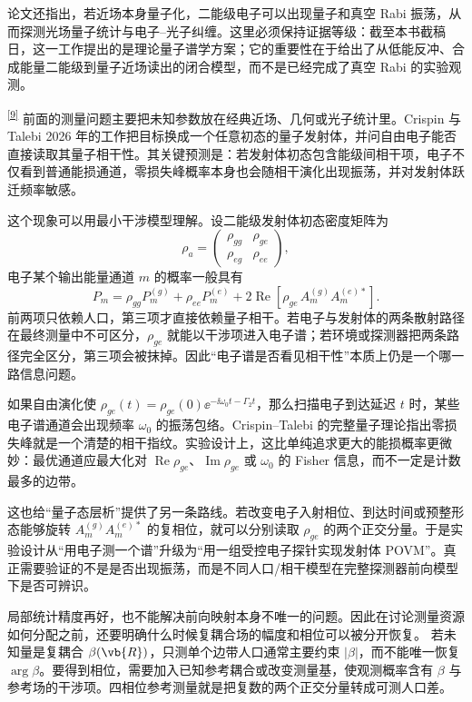 论文还指出，若近场本身量子化，二能级电子可以出现量子和真空 Rabi 振荡，从而探测光场量子统计与电子--光子纠缠。这里必须保持证据等级：截至本书截稿日，这一工作提出的是理论量子谱学方案；它的重要性在于给出了从低能反冲、合成能量二能级到量子近场读出的闭合模型，而不是已经完成了真空 Rabi 的实验观测。


\textsuperscript{\hyperref[ch07-ref9]{[9]}}
前面的测量问题主要把未知参数放在经典近场、几何或光子统计里。Crispin 与 Talebi 2026 年的工作把目标换成一个任意初态的量子发射体，并问自由电子能否直接读取其量子相干性。其关键预测是：若发射体初态包含能级间相干项，电子不仅看到普通能损通道，零损失峰概率本身也会随相干演化出现振荡，并对发射体跃迁频率敏感。

这个现象可以用最小干涉模型理解。设二能级发射体初态密度矩阵为
\begin{equation}
\rho_a=
\begin{pmatrix}
\rho_{gg}&\rho_{ge}\\
\rho_{eg}&\rho_{ee}
\end{pmatrix},
\label{eq:ch07-emitter-rho}
\end{equation}
电子某个输出能量通道 $m$ 的概率一般具有
\begin{equation}
P_m=\rho_{gg}P_m^{(g)}+\rho_{ee}P_m^{(e)}
+2\operatorname{Re}\!\left[\rho_{ge}\,A_m^{(g)}A_m^{(e)*}\right].
\label{eq:ch07-coherence-interference}
\end{equation}
前两项只依赖人口，第三项才直接依赖量子相干。若电子与发射体的两条散射路径在最终测量中不可区分，$\rho_{ge}$ 就能以干涉项进入电子谱；若环境或探测器把两条路径完全区分，第三项会被抹掉。因此“电子谱是否看见相干性”本质上仍是一个哪一路信息问题。

如果自由演化使 $\rho_{ge}(t)=\rho_{ge}(0)\ee^{-\ii\omega_0t-\Gamma_2t}$，那么扫描电子到达延迟 $t$ 时，某些电子谱通道会出现频率 $\omega_0$ 的振荡包络。Crispin--Talebi 的完整量子理论指出零损失峰就是一个清楚的相干指纹。实验设计上，这比单纯追求更大的能损概率更微妙：最优通道应最大化对 $\operatorname{Re}\rho_{ge}$、$\operatorname{Im}\rho_{ge}$ 或 $\omega_0$ 的 Fisher 信息，而不一定是计数最多的边带。

这也给“量子态层析”提供了另一条路线。若改变电子入射相位、到达时间或预整形态能够旋转 $A_m^{(g)}A_m^{(e)*}$ 的复相位，就可以分别读取 $\rho_{ge}$ 的两个正交分量。于是实验设计从“用电子测一个谱”升级为“用一组受控电子探针实现发射体 POVM”。真正需要验证的不是是否出现振荡，而是不同人口/相干模型在完整探测器前向模型下是否可辨识。


局部统计精度再好，也不能解决前向映射本身不唯一的问题。因此在讨论测量资源如何分配之前，还要明确什么时候复耦合场的幅度和相位可以被分开恢复。
若未知量是复耦合 $\beta(\vb{R})$，只测单个边带人口通常主要约束 $|\beta|$，而不能唯一恢复 $\arg\beta$。要得到相位，需要加入已知参考耦合或改变测量基，使观测概率含有 $\beta$ 与参考场的干涉项。四相位参考测量就是把复数的两个正交分量转成可测人口差。

